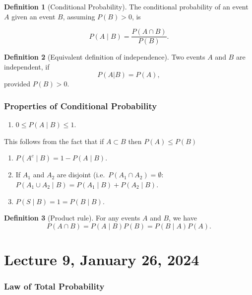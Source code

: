 \documentclass[
]{book}
\providecommand{\tightlist}{%
  \setlength{\itemsep}{0pt}\setlength{\parskip}{0pt}}
\theoremstyle{definition}
\newtheorem{definition}{Definition}[chapter]
\theoremstyle{definition}
\theoremstyle{definition}
\theoremstyle{definition}
\theoremstyle{remark}
\begin{document}
\begin{definition}[Conditional Probability]
The conditional probability of an event \(A\) given an event \(B\), assuming \(P(B)>0\), is

\[
  P(A \mid B) = \frac{P(A\cap B)}{P(B)}.
\]
\end{definition}

\begin{definition}[Equivalent definition of independence]
Two events \(A\) and \(B\) are independent, if
\[
P(A|B)=P(A),
\]
provided \(P(B)>0\).
\end{definition}

\subsection{Properties of Conditional Probability}\label{properties-of-conditional-probability}

\begin{enumerate}
\def\labelenumi{\arabic{enumi}.}
\tightlist
\item
  \(0 \le P(A \mid B) \le 1\).
\end{enumerate}

This follows from the fact that if \(A \subset B\) then \(P(A) \le P(B)\)

\begin{enumerate}
\def\labelenumi{\arabic{enumi}.}
\setcounter{enumi}{1}
\item
  \(P(A^c \mid B) = 1-P(A \mid B)\).
\item
  If \(A_1\) and \(A_2\) are disjoint (i.e.~\(P(A_1\cap A_2)=\emptyset\): \(P(A_1 \cup A_2  \mid B) = P(A_1 \mid B) + P(A_2 \mid B)\).
\item
  \(P(S \mid B)= 1 = P(B \mid B)\).
\end{enumerate}

\begin{definition}[Product rule]
For any events \(A\) and \(B\), we have
\[
P(A\cap B) = P(A\mid B) P(B)  = P(B \mid A) P(A).
\]
\end{definition}

\chapter{Lecture 9, January 26, 2024}\label{lecture-9-january-26-2024}

\subsection{Law of Total Probability}\label{law-of-total-probability}
\end{document}
